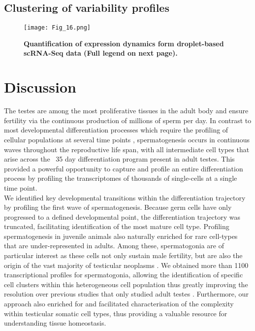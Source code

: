 \subsection{Clustering of variability profiles}


\newpage

\begin{figure}[!h]
\centering
\texttt{[image: Fig\_16.png]}
\caption[Quantification of expression dynamics form droplet-based scRNA-Seq data]{\textbf{Quantification of expression dynamics form droplet-based scRNA-Seq data (Full legend on next page).}}
\label{fig3:linear_variability}
\end{figure}

\newpage



\section{Discussion}

The testes are among the most proliferative tissues in the adult body and ensure fertility via the continuous production of millions of sperm per day. In contrast to most developmental differentiation processes which require the profiling of cellular populations at several time points \citep{Kernfeld2018, Scialdone2016, Wagner2018}, spermatogenesis occurs in continuous waves throughout the reproductive life span, with all intermediate cell types that arise across the ~35 day differentiation program present in adult testes. This provided a powerful opportunity to capture and profile an entire differentiation process by profiling the transcriptomes of thousands of single-cells at a single time point. \\

We identified key developmental transitions within the differentiation trajectory by profiling the first wave of spermatogenesis. Because germ cells have only progressed to a defined developmental point, the differentiation trajectory was truncated, facilitating identification of the most mature cell type. Profiling spermatogenesis in juvenile animals also naturally enriched for rare cell-types that are under-represented in adults. Among these, spermatogonia are of particular interest as these cells not only sustain male fertility, but are also the origin of the vast majority of testicular neoplasms \citep{Bosl1997}. We obtained more than 1100 transcriptional profiles for spermatogonia, allowing the identification of specific cell clusters within this heterogeneous cell population thus greatly improving the resolution over previous studies that only studied adult testes \citep{Lukassen2018}. Furthermore, our approach also enriched for and facilitated characterisation of the complexity within testicular somatic cell types, thus providing a valuable resource for understanding tissue homeostasis.\\

